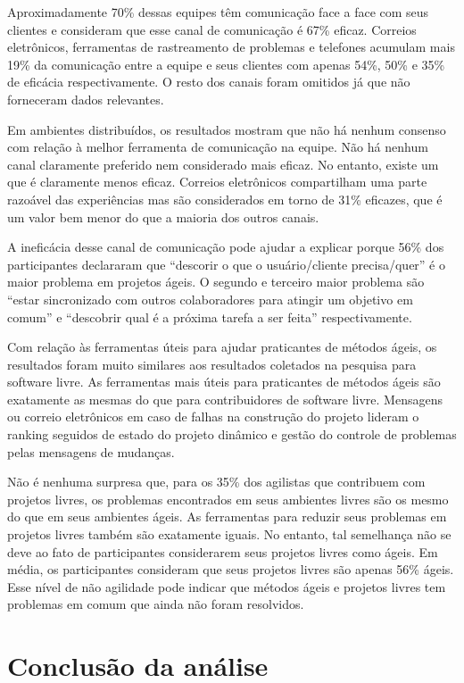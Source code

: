 Aproximadamente 70\% dessas equipes têm comunicação face a face com
seus clientes e consideram que esse canal de comunicação é 67\%
eficaz. Correios eletrônicos, ferramentas de rastreamento de problemas
e telefones acumulam mais 19\% da comunicação entre a equipe e seus
clientes com apenas 54\%, 50\% e 35\% de eficácia respectivamente. O
resto dos canais foram omitidos já que não forneceram dados
relevantes.

Em ambientes distribuídos, os resultados mostram que não há nenhum
consenso com relação à melhor ferramenta de comunicação na equipe. Não
há nenhum canal claramente preferido nem considerado mais eficaz. No
entanto, existe um que é claramente menos eficaz. Correios eletrônicos
compartilham uma parte razoável das experiências mas são considerados
em torno de 31\% eficazes, que é um valor bem menor do que a maioria
dos outros canais.

A ineficácia desse canal de comunicação pode ajudar a explicar porque
56\% dos participantes declararam que ``descorir o que o
usuário/cliente precisa/quer'' é o maior problema em projetos ágeis. O
segundo e terceiro maior problema são ``estar sincronizado com outros
colaboradores para atingir um objetivo em comum'' e ``descobrir qual é
a próxima tarefa a ser feita'' respectivamente.

Com relação às ferramentas úteis para ajudar praticantes de métodos
ágeis, os resultados foram muito similares aos resultados coletados na
pesquisa para software livre. As ferramentas mais úteis para
praticantes de métodos ágeis são exatamente as mesmas do que para
contribuidores de software livre. Mensagens ou correio eletrônicos em
caso de falhas na construção do projeto lideram o ranking seguidos de
estado do projeto dinâmico e gestão do controle de problemas pelas
mensagens de mudanças.

Não é nenhuma surpresa que, para os 35\% dos agilistas que contribuem
com projetos livres, os problemas encontrados em seus ambientes livres
são os mesmo do que em seus ambientes ágeis. As ferramentas para
reduzir seus problemas em projetos livres também são exatamente
iguais. No entanto, tal semelhança não se deve ao fato de
participantes considerarem seus projetos livres como ágeis. Em média,
os participantes consideram que seus projetos livres são apenas 56\%
ágeis. Esse nível de não agilidade pode indicar que métodos ágeis e
projetos livres tem problemas em comum que ainda não foram resolvidos.

\section{Conclusão da análise}
\label{sec:proposta}

